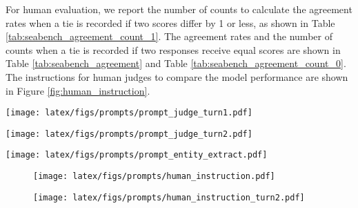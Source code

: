 For human evaluation, we report the number of counts to calculate the agreement rates when a tie is recorded if two scores differ by 1 or less, as shown in Table \ref{tab:seabench_agreement_count_1}. The agreement rates and the number of counts when a tie is recorded if two responses receive equal scores are shown in Table \ref{tab:seabench_agreement} and Table \ref{tab:seabench_agreement_count_0}. The instructions for human judges to compare the model performance are shown in Figure \ref{fig:human_instruction}.


\begin{figure*}[ht]
    \centering
    \texttt{[image: latex/figs/prompts/prompt\_judge\_turn1.pdf]}
    \caption{The prompt for reference-guided single-turn single-answer grading.}
    \label{fig:prompt_template_turn1}
\end{figure*}

\begin{figure*}[htb]
    \centering
    \texttt{[image: latex/figs/prompts/prompt\_judge\_turn2.pdf]}
    \caption{The prompt for reference-guided multi-turn single-answer grading.}
    \label{fig:prompt_template_turn2}
\end{figure*}

\begin{figure*}
    \centering
    \texttt{[image: latex/figs/prompts/prompt\_entity\_extract.pdf]}
    \caption{The prompt to extract entities from a query  .}
    \label{fig:prompt_entity_extract}
\end{figure*}

\begin{figure*}[htb]
    \centering
    \begin{subfigure}[b]{0.98\textwidth}
        \centering
        \texttt{[image: latex/figs/prompts/human\_instruction.pdf]}
        \caption{}
        \label{subfig:}
    \end{subfigure}
    \begin{subfigure}[b]{0.98\textwidth}
        \centering
        \texttt{[image: latex/figs/prompts/human\_instruction\_turn2.pdf]}
        \caption{}
        \label{subfig:}
    \end{subfigure}
    \caption{Instructions for humans to compare the model performance in (a) turn 1, and (b) turn 2.}
    \label{fig:human_instruction}
\end{figure*}










